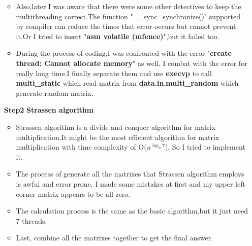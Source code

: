 \documentclass[]{article}
\begin{document}
\begin{enumerate}
\begin{itemize}
        \item Also,later I was aware that there were some other detectives to keep the multithreading correct.The function "\_\_sync\_synchronize()"
        supported by compiler can reduce the times that error occurs but cannot prevent it.Or I tried to insert "\textbf{asm volatile (mfence)}",but it failed too.\par         
        \item During the process of coding,I was confronted with the error "\textbf{create thread: Cannot allocate memory}" as well.
        I combat with the error for really long time.I finally separate them and use \textbf{execvp} to call \textbf{multi\_static} which read matrix from \textbf{data.in},\textbf{multi\_random} which generate random matrix.\par 
    \end{itemize}
    \item [\textbf{Step2}] \textbf{Strassen algorithm}
    \begin{itemize}
        \item Strassen algorithm is a divide-and-conquer algorithm for matrix multiplication.It might be the most efficient algorithm for matrix multiplication with time complexity of O($n^{\log_2 7}$).
        So I tried to implement it.
        \item The process of generate all the matrixes that Strassen algorithm employs is awful and error prone. I made some mistakes at first and my upper left corner matrix appears to be all zero.
        \item The calculation process is the same as the basic algorithm,but it just need 7 threads.
        \item Last, combine all the matrixes together to get the final answer. 
    \end{itemize}
\end{enumerate}
\end{document}
